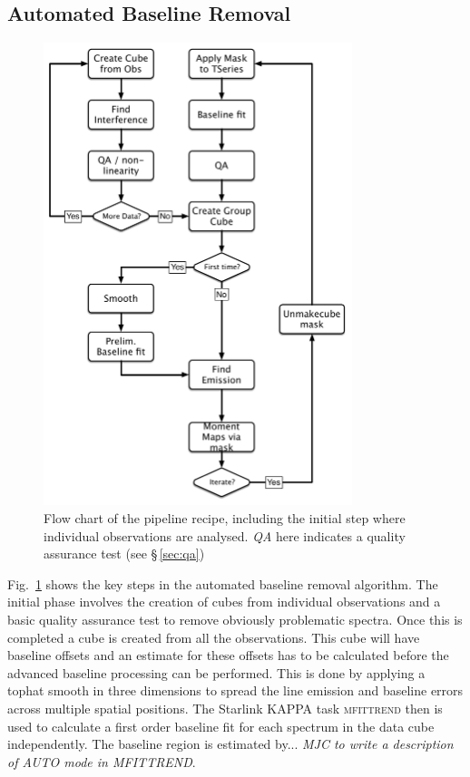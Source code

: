 \documentclass[final,authoryear,5p,times,twocolumn]{elsarticle}
\begin{document}
\subsection{Automated Baseline Removal}

\begin{figure}
\includegraphics[width=90mm]{flowchart}
\caption{Flow chart of the pipeline recipe, including the initial step
  where individual observations are analysed. \emph{QA} here indicates
a quality assurance test (see \S\,\ref{sec:qa})}
\label{fig:flowchart}
\end{figure}

Fig.\ \ref{fig:flowchart} shows the key steps in the automated
baseline removal algorithm. The initial phase involves the creation of
cubes from individual observations and a basic quality assurance test
to remove obviously problematic spectra. Once this is completed a cube
is created from all the observations. This cube will have baseline
offsets and an estimate for these offsets has to be calculated before
the advanced baseline processing can be performed. This is done by
applying a tophat smooth in three dimensions to spread the line
emission and baseline errors across multiple spatial positions. The
Starlink KAPPA task \textsc{mfittrend} then is used to calculate a
first order baseline fit for each spectrum in the data cube
independently. The baseline region is estimated by... \emph{MJC to
  write a description of AUTO mode in MFITTREND}.
\end{document}
